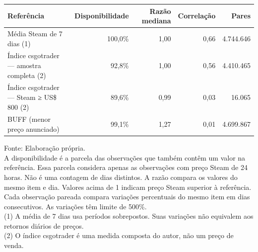 \begingroup
\setlength{}
\setlength{}
\fontsize{9.0pt}{10.8pt}\selectfont

\setlength{\LTpost}{0mm}
\begin{longtable}{@{\extracolsep{\fill}}lrrrr}

\toprule
\textbf{Referência} & \textbf{Disponibilidade} & \textbf{Razão mediana} & \textbf{Correlação} & \textbf{Pares} \\ 
\midrule\addlinespace[2.5pt]
Média Steam de 7 dias (1) & 100,0\% & 1,00 & 0,66 & 4.744.646 \\
Índice csgotrader — amostra completa (2) & 92,8\% & 1,00 & 0,56 & 4.410.465 \\
Índice csgotrader — Steam ≥ US\$ 800 (2) & 89,6\% & 0,99 & 0,03 & 16.065 \\
BUFF (menor preço anunciado) & 99,1\% & 1,27 & 0,01 & 4.699.867 \\
\bottomrule
\end{longtable}
\begin{minipage}{\linewidth}
Fonte: Elaboração própria.\\
A disponibilidade é a parcela das observações que também contêm um valor na referência. Essa parcela considera apenas as observações com preço Steam de 24 horas. Não é uma contagem de dias distintos. A razão compara os valores do mesmo item e dia. Valores acima de 1 indicam preço Steam superior à referência. Cada observação pareada compara variações percentuais do mesmo item em dias consecutivos. As variações têm limite de 500\%.\\
(1) A média de 7 dias usa períodos sobrepostos. Suas variações não equivalem aos retornos diários de preços.\\
(2) O índice csgotrader é uma medida composta do autor, não um preço de venda.\\
\end{minipage}
\endgroup
